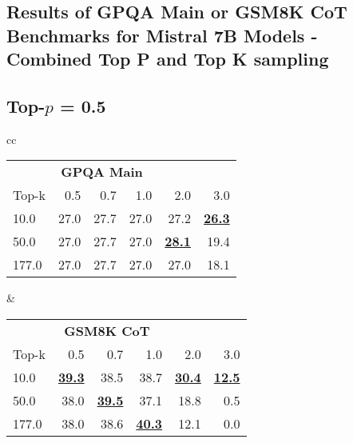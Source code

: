 \documentclass{article}
\begin{document}
\clearpage
\subsection{Results of {GPQA Main or GSM8K CoT} Benchmarks for Mistral 7B Models - Combined Top P and Top K sampling}

\begin{table*}[ht]
\centering
\caption{Accuracy (\%) on GPQA Main and GSM8K CoT benchmarks for various Top P, Top K and Temperature configurations on Mistral 7B.}
\label{tab:benchmark_comparison}
\subsection*{Top-\(p\) = 0.5}
\begin{tabular}{cc}
\begin{tabular}{lrrrrr}
\toprule
\multicolumn{5}{c}{\textbf{GPQA Main}} \\
Top-k & 0.5 & 0.7 & 1.0 & 2.0 & 3.0 \\
\midrule
10.0 & 27.0 & 27.7 & 27.0 & 27.2 & \textbf{\underline{26.3}} \\
50.0 & 27.0 & 27.7 & 27.0 & \textbf{\underline{28.1}} & 19.4 \\
177.0 & 27.0 & 27.7 & 27.0 & 27.0 & 18.1 \\
\bottomrule
\end{tabular}
&
\begin{tabular}{lrrrrr}
\toprule
\multicolumn{5}{c}{\textbf{GSM8K CoT}} \\
Top-k & 0.5 & 0.7 & 1.0 & 2.0 & 3.0 \\
\midrule
10.0 & \textbf{\underline{39.3}} & 38.5 & 38.7 & \textbf{\underline{30.4}} & \textbf{\underline{12.5}} \\
50.0 & 38.0 & \textbf{\underline{39.5}} & 37.1 & 18.8 & 0.5 \\
177.0 & 38.0 & 38.6 & \textbf{\underline{40.3}} & 12.1 & 0.0 \\
\bottomrule
\end{tabular}
\end{tabular}


\end{table*}
\end{document}
